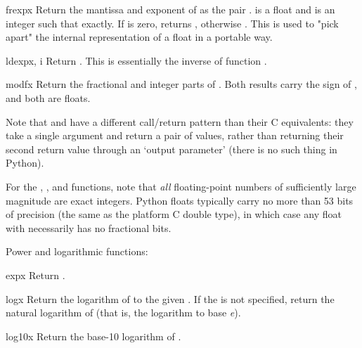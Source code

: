 \begin{funcdesc}{frexp}{x}
Return the mantissa and exponent of  as the pair
.   is a float and  is an
integer such that  exactly.
If  is zero, returns , otherwise
.  This is used to "pick apart" the
internal representation of a float in a portable way.
\end{funcdesc}

\begin{funcdesc}{ldexp}{x, i}
Return .  This is essentially the inverse of
function .
\end{funcdesc}

\begin{funcdesc}{modf}{x}
Return the fractional and integer parts of .  Both results
carry the sign of , and both are floats.
\end{funcdesc}

Note that  and  have a different
call/return pattern than their C equivalents: they take a single
argument and return a pair of values, rather than returning their
second return value through an `output parameter' (there is no such
thing in Python).

For the , , and 
functions, note that \emph{all} floating-point numbers of sufficiently
large magnitude are exact integers.  Python floats typically carry no more
than 53 bits of precision (the same as the platform C double type), in
which case any float  with 
necessarily has no fractional bits.


Power and logarithmic functions:

\begin{funcdesc}{exp}{x}
Return .
\end{funcdesc}

\begin{funcdesc}{log}{x}
Return the logarithm of  to the given .
If the  is not specified, return the natural logarithm of 
(that is, the logarithm to base \emph{e}).
\end{funcdesc}

\begin{funcdesc}{log10}{x}
Return the base-10 logarithm of .
\end{funcdesc}

